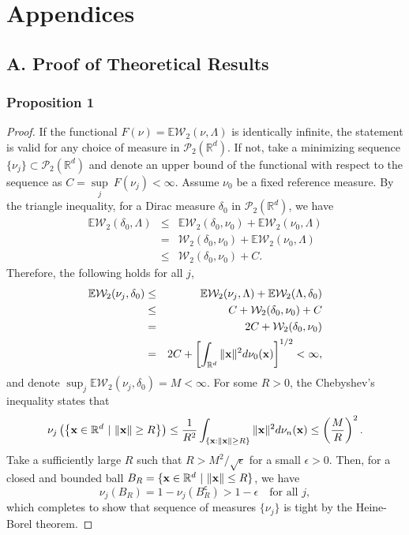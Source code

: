 \documentclass[11pt]{article}
\newcommand{\calP}{\mathcal{P}}
\newcommand{\calW}{\mathcal{W}}
\newcommand{\bbE}{\mathbb{E}}
\newcommand{\Rd}{\mathbb{R}^d}
\begin{document}
\appendix
\section*{Appendices}
\subsection*{A. Proof of Theoretical Results}
\subsubsection*{Proposition 1}
\begin{proof}
	If the functional $F(\nu) = \bbE \calW_2 (\nu, \Lambda)$ is identically infinite, the statement is valid for any choice of measure in $\calP_2(\Rd)$. If not, take a minimizing sequence $\lbrace \nu_j\rbrace \subset  \calP_2(\Rd)$ and denote an upper bound of the functional with respect to the sequence as $C = \underset{j}{\sup}~ F(\nu_j) < \infty$. Assume $\nu_0$ be a fixed reference measure. By the triangle inequality, for a Dirac measure $\delta_0$ in $\calP_2(\Rd)$, we have
	\begin{eqnarray*}
		\bbE \calW_2 (\delta_0, \Lambda) &\leq& \bbE \calW_2 (\delta_0, \nu_0) + \bbE \calW_2 (\nu_0, \Lambda)\\
		&=& \calW_2 (\delta_0, \nu_0) + \bbE \calW_2 (\nu_0, \Lambda) \\
		&\leq& \calW_2 (\delta_0, \nu_0) + C.
	\end{eqnarray*}
	Therefore, the following holds for all $j$,
	\begin{eqnarray*}
		\bbE \calW_2 (\nu_j, \delta_0) &\leq& \bbE \calW_2 (\nu_j, \Lambda) + \bbE \calW_2 (\Lambda, \delta_0)\\
		&\leq& C + \calW_2 (\delta_0, \nu_0) + C\\ &=& 2C + \calW_2 (\delta_0, \nu_0) \\ &=& 2C + \left\lbrack \int_{\Rd} \| {\bf  x}\|^2 d\nu_0({\bf x}) \right\rbrack^{1/2} < \infty,
	\end{eqnarray*}
	and denote $\sup_j \bbE \calW_2 (\nu_j, \delta_0) = M < \infty$. For some $R>0$, the Chebyshev's inequality states that
	\begin{equation*}
	\nu_j \left(\left\lbrace {\bf x}\in\Rd ~|~\|{\bf x}\|\geq R \right\rbrace\right) \leq 
	\frac{1}{R^2} \int_{\lbrace {\bf x}:\|{\bf x}\|\geq R\rbrace} \|{\bf x}\|^2 d\nu_n ({\bf x}) \leq \left(\frac{M}{R}\right)^2.
	\end{equation*}
	Take a sufficiently large $R$ such that $R > M^2 / \sqrt{\epsilon}$ for a small $\epsilon > 0$. Then, for a closed and bounded ball $B_{R} = \lbrace {\bf x}\in\Rd ~|~\|{\bf x}\|\leq R \rbrace$, we have
	\begin{equation*}
	\nu_j (B_R) = 1 - \nu_j(B_R^\mathsf{c}) > 1 - \epsilon \quad \text{for all }j,
	\end{equation*}
	which completes to show that sequence of measures $\lbrace \nu_j \rbrace$ is tight by the Heine-Borel theorem.
	

\end{proof}
\end{document}
